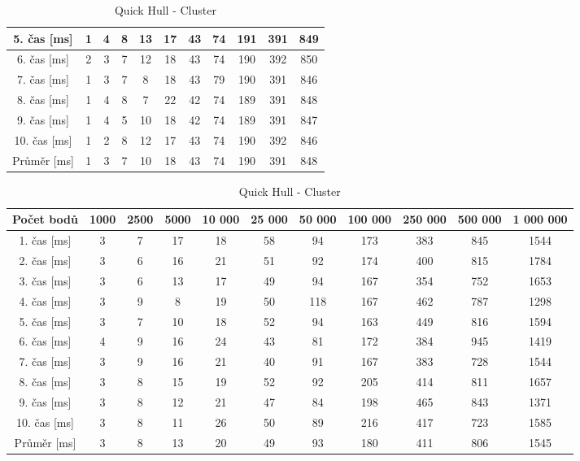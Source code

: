 \documentclass{article}
\begin{document}
\begin{center}
\begin{table}[]
\begin{tabular}{|c|c|c|c|c|c|c|c|c|c|c|}
 		5. čas [ms]&  1&  4&  8&  13&  17&  43&  74&  191&  391&  849\\ \hline
 		6. čas [ms]&  2&  3&  7&  12&   18& 43&  74&  190&  392&  850\\ \hline
 		7. čas [ms]&  1&  3&  7&    8&   18& 43&  79&  190&  391&  846\\ \hline
 		8. čas [ms]&  1&  4&  8&    7&   22& 42&  74&  189&  391&  848\\ \hline
 		9. čas [ms]&  1&  4&  5&  10&   18& 42&  74&  189&  391&  847\\ \hline
		10. čas [ms]&1&  2&  8&  12&   17& 43&  74&  190&  392& 846\\ \hline \hline
 		Průměr [ms]&  1& 3 &7& 10 & 18 & 43 & 74 &  190&  391& 848 \\ \hline
	\end{tabular}
%
	\centering
	\caption{Quick Hull - Cluster}
	\label{my-label}
	\begin{tabular}{|c|c|c|c|c|c|c|c|c|c|c|}
		\hline 
 	Počet bodů&  1000& 2500 & 5000 & 10 000 & 25 000 & 50 000  & 100 000  & 250 000  & 500 000 & 1 000 000  \\ \hline \hline
 		1. čas [ms]&  3&  7&  17&  18&  58&   94&  173&  383&  845&  1544\\ \hline
 		2. čas [ms]&  3&  6&  16&  21&  51&   92&  174&  400&  815&  1784\\ \hline
 		3. čas [ms]&  3&  6&  13&  17&  49&   94&  167&  354&  752&  1653\\ \hline
 		4. čas [ms]&  3&  9&    8&  19&  50& 118&  167&  462&  787&  1298\\ \hline
 		5. čas [ms]&  3&  7&  10&  18&  52&   94&  163&  449&  816&  1594\\ \hline
 		6. čas [ms]&  4&  9&  16&  24&  43&   81&  172&  384&  945&  1419\\ \hline
 		7. čas [ms]&  3&  9&  16&  21&  40&   91&  167&  383&  728&  1544\\ \hline
 		8. čas [ms]&  3&  8&  15&  19&  52&   92&  205&  414&  811&  1657\\ \hline
 		9. čas [ms]&  3&  8&  12&  21&  47&   84&  198&  465&  843&  1371\\ \hline
		10. čas [ms]&3&  8&  11&  26&  50&   89&  216&  417&  723&  1585\\ \hline \hline
 		Průměr [ms]&  3&  8&  13& 20 & 49 & 93 & 180 &411  &806  &1545  \\ \hline
	\end{tabular}
	\end{table}
\end{center}
\end{document}
